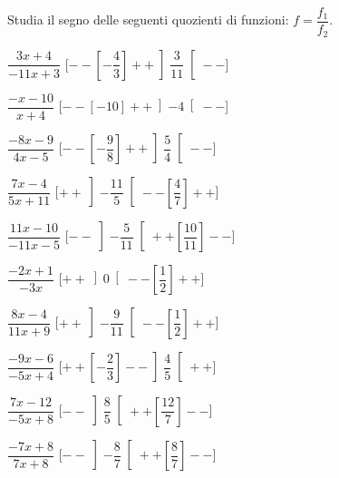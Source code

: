 \begin{esercizio}\label{ese:dis_7}
 Studia il segno delle seguenti quozienti di funzioni: 
 \(f = \dfrac {f_1}{f_2}\).
\begin{htmulticols}{2}
 \begin{enumeratea}
  \item  \(\dfrac{3 x +4}{-11 x +3}\) \hfill 
  [\(--\left [-\dfrac{4}{3} \right ]++\left ]\dfrac{3}{11} \right [--\)]
  \item  \(\dfrac{- x -10}{x +4}\) \hfill 
  [\(--\left [-10 \right ]++\left ]-4 \right [--\)]
  \item  \(\dfrac{-8 x -9}{4 x -5}\) \hfill 
  [\(--\left [-\dfrac{9}{8} \right ]++\left ]\dfrac{5}{4} \right [--\)]
  \item  \(\dfrac{7 x -4}{5 x +11}\) \hfill 
  [\(++\left ]-\dfrac{11}{5} \right [--\left [\dfrac{4}{7} \right ]++\)]
  \item  \(\dfrac{11 x -10}{-11 x -5}\) \hfill 
  [\(--\left ]-\dfrac{5}{11} \right [++\left [\dfrac{10}{11} \right ]--\)]
  \item  \(\dfrac{-2 x +1}{-3 x }\) \hfill 
  [\(++\left ]0 \right [--\left [\dfrac{1}{2} \right ]++\)]
  \item  \(\dfrac{8 x -4}{11 x +9}\) \hfill 
  [\(++\left ]-\dfrac{9}{11} \right [--\left [\dfrac{1}{2} \right ]++\)]
  \item  \(\dfrac{-9 x -6}{-5 x +4}\) \hfill 
  [\(++\left [-\dfrac{2}{3} \right ]--\left ]\dfrac{4}{5} \right [++\)]
  \item  \(\dfrac{7 x -12}{-5 x +8}\) \hfill 
  [\(--\left ]\dfrac{8}{5} \right [++\left [\dfrac{12}{7} \right ]--\)]
  \item  \(\dfrac{-7 x +8}{7 x +8}\) \hfill 
  [\(--\left ]-\dfrac{8}{7} \right [++\left [\dfrac{8}{7} \right ]--\)]
 \end{enumeratea}
\end{htmulticols}
\end{esercizio}

